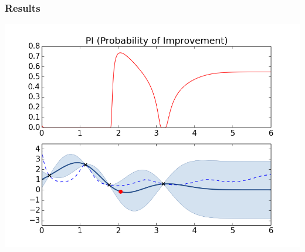 \documentclass[10pt,handout]{beamer}
\begin{document}
\begin{frame}
\frametitle{Results}
\includegraphics[width=\textwidth]{PI.png}
\end{frame}
\end{document}
